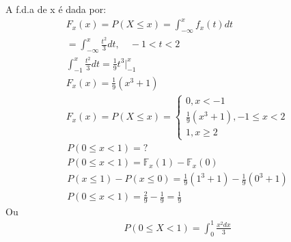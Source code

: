 \documentclass[11pt,a4paper]{book}
\begin{document}
\begin{description}
     A f.d.a de x é dada por: 
     \begin{align*}
       F_{x}(x)= P(X \le x)= \int_{-\infty}^{x} f_{x}(t) dt\\
       = \int_{-\infty}^{x} \frac{t^2}{3} dt , \quad -1<t<2 \\
       \int_{-1}^{x} \frac{t^2}{3} dt= \frac{1}{9} t^3 |^x_{-1}\\
       F_{x}(x)= \frac{1}{9}(x^3 +1)\\
       F_{x}(x)=P(X \le x)= 
       \begin{cases}
         0, x <-1 \\
         \frac{1}{9}(x^3 +1) , -1 \le x <2 \\
         1, x \geq 2
       \end{cases}
     \end{align*}
     \begin{align*}
       P(0 \le x <1)=? \\
       P(0 \le x <1)= \mathbb{F}_{x}(1)- \mathbb{F}_{x}(0)\\
       P(x \le 1 ) - P(x \le 0)= \frac{1}{9} (1^3 + 1 ) - \frac{1}{9}(0^3+ 1)\\
       P(0 \le x < 1 )= \frac{2}{9} - \frac{1}{9} = \frac{1}{9}
     \end{align*}
     Ou 
     \begin{align*}
       P(0 \leq X < 1) = \int_{0}^{1} \frac{x^2 dx}{3} 
     \end{align*}
 \end{description}
\end{document}
